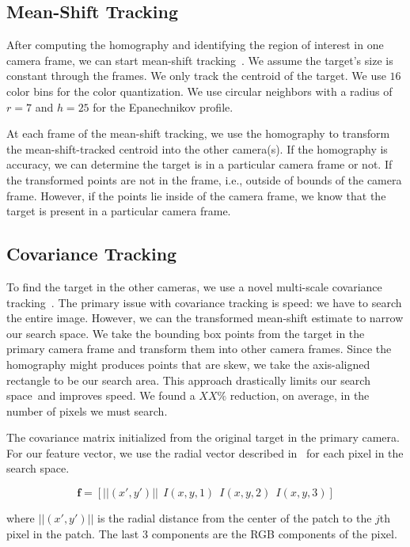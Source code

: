 \documentclass{article}
\begin{document}
\subsection{Mean-Shift Tracking}
\label{sec:meanshift}
After computing the homography and identifying the region of interest in one camera frame, we can start mean-shift tracking~\cite{comaniciu2003kernel}. We assume the target's size is constant through the frames. We only track the centroid of the target. We use $16$ color bins for the color quantization. We use circular neighbors with a radius of $r=7$ and $h=25$ for the Epanechnikov profile.

At each frame of the mean-shift tracking, we use the homography to transform the mean-shift-tracked centroid into the other camera(s). If the homography is accuracy, we can determine the target is in a particular camera frame or not. If the transformed points are not in the frame, i.e., outside of bounds of the camera frame. However, if the points lie inside of the camera frame, we know that the target is present in a particular camera frame.

\subsection{Covariance Tracking}
\label{sec:covariance}
To find the target in the other cameras, we use a novel multi-scale covariance tracking~\cite{porikli2006covariance}. The primary issue with covariance tracking is speed: we have to search the entire image. However, we can the transformed mean-shift estimate to narrow our search space. We take the bounding box points from the target in the primary camera frame and transform them into other camera frames. Since the homography might produces points that are skew, we take the axis-aligned rectangle to be our search area. This approach drastically limits our search space and improves speed. We found a $XX\%$ reduction, on average, in the number of pixels we must search.

The covariance matrix initialized from the original target in the primary camera. For our feature vector, we use the radial vector described in~\cite{porikli2006covariance} for each pixel in the search space.

\[
\mathbf{f} = \left[ ||(x', y')||~~I(x,y,1)~~I(x,y,2)~~I(x,y,3)\right]
\]

where $||(x', y')||$ is the radial distance from the center of the patch to the $j$th pixel in the patch. The last $3$ components are the RGB components of the pixel.
\end{document}
